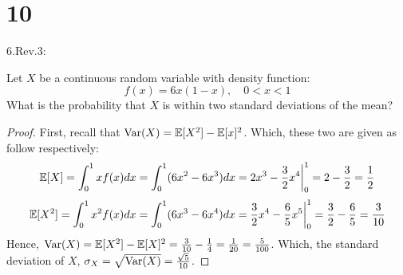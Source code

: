 \documentclass{article}
\begin{document}
\newpage
\section*{10}
\begin{ques}\label{q10}
    6.Rev.3:

    Let $X$ be a continuous random variable with density function:
    $$f(x)=6x(1-x), \quad 0<x<1$$
    What is the probability that $X$ is within two standard deviations of the mean?
\end{ques}

\begin{proof}
    First, recall that $\mathrm{Var}(X)=\mathbb{E}[X^2]-\mathbb{E}[x]^2$. Which, these two are given as follow respectively:
    \begin{align}
        \mathbb{E}[X] = \int_{0}^{1}x f(x)dx = \int_{0}^{1}(6x^2-6x^3)dx = 2x^3-\frac{3}{2}x^4\bigg|_{0}^{1} = 2-\frac{3}{2}=\frac{1}{2}
    \end{align}
    \begin{align}
        \mathbb{E}[X^2] = \int_{0}^{1}x^2 f(x)dx = \int_{0}^{1}(6x^3-6x^4)dx = \frac{3}{2}x^4-\frac{6}{5}x^5\bigg|_{0}^{1} = \frac{3}{2}-\frac{6}{5}=\frac{3}{10}
    \end{align}
    Hence, $\mathrm{Var}(X)=\mathbb{E}[X^2]-\mathbb{E}[X]^2 = \frac{3}{10}-\frac{1}{4}=\frac{1}{20} = \frac{5}{100}$. Which, the standard deviation of $X$, $\sigma_X = \sqrt{\mathrm{Var}(X)} = \frac{\sqrt{5}}{10}$.

    \hfil


\end{proof}
\end{document}
